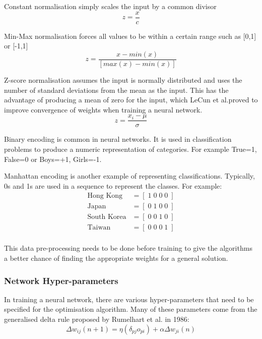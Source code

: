 Constant normalisation simply scales the input by a common divisor
\begin{equation}
z=\frac{x}{c}
\end{equation}

Min-Max normalisation forces all values to be within a certain range such as [0,1] or [-1,1]
\begin{equation}
z=\frac{x-min(x)}{[max(x)-min(x)]}
\end{equation}

Z-score normalisation assumes the input is normally distributed and uses the number of standard deviations from the mean as the input. This has the advantage of producing a mean of zero for the input, which LeCun et al.proved to improve convergence of weights\cite{LeCun_backprop} when training a neural network.
\begin{equation}
z=\frac{x_i-\mu}{\sigma}
\end{equation}

Binary encoding is common in neural networks. It is used in classification problems to produce a numeric representation of categories. For example True=1, False=0 or Boys=+1, Girls=-1.

Manhattan encoding is another example of representing classifications\cite{intro_ml}. Typically, 0s and 1s are used in a sequence to represent the classes. For example:
\begin{align*}
    \text{Hong Kong}&=[\;1\;0\;0\;0\;] \\
    \text{Japan}&=[\;0\;1\;0\;0\;] \\
    \text{South Korea}&=[\;0\;0\;1\;0\;] \\
    \text{Taiwan}&=[\;0\;0\;0\;1\;] \\
\end{align*}

This data pre-processing needs to be done before training to give the algorithms a better chance of finding the appropriate weights for a general solution.

\subsubsection{Network Hyper-parameters}\label{subsubsec:hyperparams}

In training a neural network, there are various hyper-parameters that need to be specified for the optimisation algorithm. Many of these parameters come from the generalised delta rule proposed by Rumelhart et al. in 1986\cite{Rumelhart_error_propagation}:
\begin{equation}
    \Delta w_{ij}(n+1)=\eta (\delta _{pj}o_{pi})+\alpha\Delta w_{ji}(n)
\end{equation}

